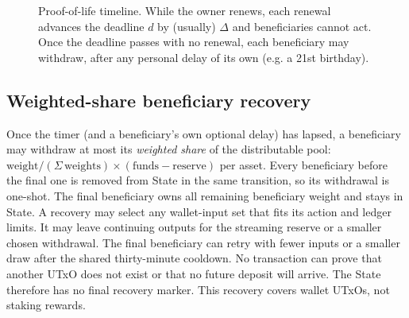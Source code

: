 \documentclass[11pt,DIV=11,parskip=half-]{scrartcl}
\begin{document}
\begin{figure}[ht]
\centering
{}
\caption{Proof-of-life timeline. While the owner renews, each renewal advances the deadline $d$ by (usually) $\Delta$ and beneficiaries cannot act. Once the deadline passes with no renewal, each beneficiary may withdraw, after any personal delay of its own (e.g. a 21st birthday).}
\label{fig:timeline}
\end{figure}

\subsection{Weighted-share beneficiary recovery}
Once the timer (and a beneficiary's own optional delay) has lapsed, a beneficiary may withdraw at most its \emph{weighted share} of the distributable pool: $\text{weight}/(\Sigma\,\text{weights}) \times (\text{funds} - \text{reserve})$ per asset. Every beneficiary before the final one is removed from State in the same transition, so its withdrawal is one-shot. The final beneficiary owns all remaining beneficiary weight and stays in State. A recovery may select any wallet-input set that fits its action and ledger limits. It may leave continuing outputs for the streaming reserve or a smaller chosen withdrawal. The final beneficiary can retry with fewer inputs or a smaller draw after the shared thirty-minute cooldown. No transaction can prove that another UTxO does not exist or that no future deposit will arrive. The State therefore has no final recovery marker. This recovery covers wallet UTxOs, not staking rewards.
\end{document}
